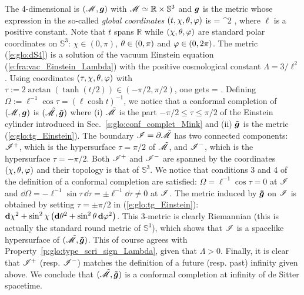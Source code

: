 \begin{example}
\label{x:glo:dS4}
The 4-dimensional  is
$(\mathscr{M},\bm{g})$ with $\mathscr{M}\simeq \mathbb{R}\times\mathbb{S}^3$ and $\bm{g}$ is the metric
whose expression in the so-called \emph{global coordinates}
$(t,\chi,\theta,\varphi)$ is
\be \label{e:glo:dS4}
     = \ell^2  ,
\ee
where $\ell$ is a positive constant. Note that $t$ spans $\mathbb{R}$
while $(\chi,\theta,\varphi)$ are standard polar coordinates on $\mathbb{S}^3$:
$\chi\in(0,\pi)$, $\theta\in(0,\pi)$ and $\varphi\in(0,2\pi)$.
 The metric (\ref{e:glo:dS4}) is a solution
of the vacuum Einstein equation (\ref{e:fra:vac_Einstein_Lambda}) with
the positive cosmological constant $\Lambda = 3/\ell^2$.
Using coordinates $(\tau,\chi,\theta,\varphi)$ with
$\tau := 2\arctan(\tanh(t/2)) \in (-\pi/2,\pi/2)$, one gets
\be
     =   .
\ee
Defining $\Omega := \ell^{-1}\cos\tau = (\ell\cosh t)^{-1}$, we notice that
a conformal completion of $(\mathscr{M},\bm{g})$ is $(\tilde{\mathscr{M}},\bm{\tilde{g}})$
where (i) $\tilde{\mathscr{M}}$ is the part $-\pi/2\leq \tau \leq \pi/2$ of the Einstein cylinder
introduced in Sec.~\ref{s:glo:conf_complet_Mink}
and (ii)  $\bm{\tilde{g}}$ is the metric (\ref{e:glo:tg_Einstein}).
The boundary $\mathscr{I} = \partial\tilde{\mathscr{M}}$ has two connected components:
$\mathscr{I}^+$, which is the hypersurface $\tau = \pi/2$ of $\tilde{\mathscr{M}}$, and
$\mathscr{I}^-$, which is the hypersurface $\tau = -\pi/2$.
Both $\mathscr{I}^+$ and $\mathscr{I}^-$ are spanned by the coordinates $(\chi,\theta,\varphi)$
and their topology is that of $\mathbb{S}^3$.
We notice that conditions 3 and 4 of the definition of a conformal completion
are satisfied: $\Omega = \ell^{-1} \cos\tau = 0$ at $\mathscr{I}$ and
$\dd\Omega = - \ell^{-1} \sin\tau\, \dd\tau = \pm \ell^{-1} \dd\tau \not = 0 $
at $\mathscr{I}$.
The metric induced by $\bm{\tilde{g}}$ on $\mathscr{I}$ is obtained by
setting $\tau=\pm\pi/2$ in (\ref{e:glo:tg_Einstein}):
$\mathbf{d} \chi^2 + \sin^2\chi \left( \mathbf{d}\theta^2 + \sin^2\theta \, \mathbf{d}\varphi^2 \right) $.
This 3-metric is clearly Riemannian (this is actually the standard round metric
of $\mathbb{S}^3$), which shows that $\mathscr{I}$ is a spacelike
hypersurface of $(\tilde{\mathscr{M}},\bm{\tilde{g}})$. This of course agrees with
Property~\ref{p:glo:type_scri_sign_Lambda}, given that $\Lambda > 0$.
Finally, it is clear that $\mathscr{I}^+$ (resp. $\mathscr{I}^-$)
matches the definition of a future (resp. past) infinity given above.
We conclude that $(\tilde{\mathscr{M}},\bm{\tilde{g}})$ is a conformal completion at infinity
of de Sitter spacetime.
\end{example}

